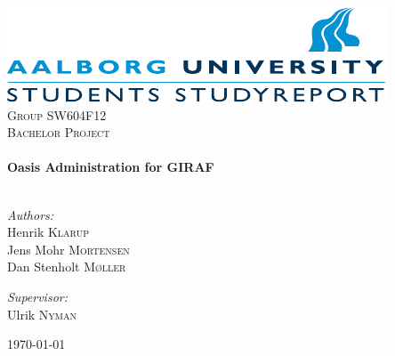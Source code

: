 



\begin{titlepage}

\begin{center}

\includegraphics[width=\textwidth]{Images/aau_logo_en.pdf}\\[1cm]    

\textsc{\LARGE Group SW604F12}\\[1.5cm]

\textsc{\Large Bachelor Project}\\[0.5cm]


\HRule \\[0.4cm]
{ \huge \bfseries Oasis Administration for GIRAF}\\[0.4cm]

\HRule \\[1.5cm]

\begin{minipage}{0.4\textwidth}
\begin{flushleft} \large
\vspace{1.25cm}
\emph{Authors:}\\
Henrik \textsc{Klarup} \\
Jens Mohr \textsc{Mortensen} \\
Dan Stenholt \textsc{M\o{}ller}
\end{flushleft}
\end{minipage}
\begin{minipage}{0.4\textwidth}
\begin{flushright} \large
\emph{Supervisor:} \\
Ulrik \textsc{Nyman}
\end{flushright}
\end{minipage}

\vfill

{\large \today}

\end{center}

\end{titlepage}

